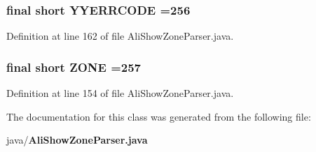 \subsubsection[{Y\-Y\-E\-R\-R\-C\-O\-D\-E}]{\setlength{\rightskip}{0pt plus 5cm}final short Y\-Y\-E\-R\-R\-C\-O\-D\-E =256\hspace{0.3cm}{\ttfamily [static]}}\label{classorg_1_1smallfoot_1_1parser_1_1zone_1_1AliShowZoneParser_a1c58472ea6621d2f613831e08d10dba3}


Definition at line 162 of file Ali\-Show\-Zone\-Parser.\-java.

\subsubsection[{Z\-O\-N\-E}]{\setlength{\rightskip}{0pt plus 5cm}final short Z\-O\-N\-E =257\hspace{0.3cm}{\ttfamily [static]}}\label{classorg_1_1smallfoot_1_1parser_1_1zone_1_1AliShowZoneParser_a8ddd6c0fce0f972519976a2c9ca1aadd}


Definition at line 154 of file Ali\-Show\-Zone\-Parser.\-java.



The documentation for this class was generated from the following file\-:\begin{DoxyCompactItemize}
\item 
java/{\bf Ali\-Show\-Zone\-Parser.\-java}\end{DoxyCompactItemize}

